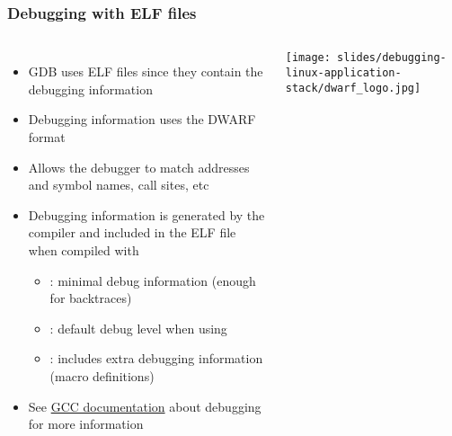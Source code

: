 \begin{frame}[fragile]
  \frametitle{Debugging with ELF files}
  \begin{columns}
    \begin{itemize}
      \item GDB uses ELF files since they contain the debugging information
      \item Debugging information uses the DWARF format
      \item Allows the debugger to match addresses and symbol names, call
            sites, etc
      \item Debugging information is generated by the compiler and included in the
            ELF file when compiled with 
      \begin{itemize}
        \item {}: minimal debug information (enough for backtraces)
        \item {}: default debug level when using 
        \item {}: includes extra debugging information (macro
          definitions)
      \end{itemize}
      \item See \href{https://gcc.gnu.org/onlinedocs/gcc/Debugging-Options.html}{GCC documentation}
        about debugging for more information
    \end{itemize}
    \texttt{[image: slides/debugging-linux-application-stack/dwarf\_logo.jpg]}
  \end{columns}
\end{frame}

